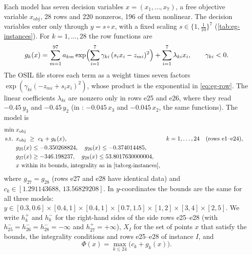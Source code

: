 Each model has seven decision variables $x=(x_1,\dots,x_7)$, a free objective variable $x_{\mathrm{obj}}$, 28 rows and 220 nonzeros, 196 of them nonlinear.
The decision variables enter only through $y=s\circ x$, with a fixed scaling $s\in\{1,\tfrac1{10}\}^7$ (\cref{tab:eg-instances}).
For $k=1,\dots,28$ the row functions are
\begin{equation}\label{eq:eg-row}
  g_k(x)=\sum_{m=1}^{97} a_{km}\exp\Bigl(\sum_{i=1}^{7}\gamma_{ki}\,(s_ix_i-z_{mi})^2\Bigr)+\sum_{i=1}^{7}\lambda_{ki}x_i ,
  \qquad \gamma_{ki}<0 .
\end{equation}
The OSIL file stores each term as a weight times seven factors $\exp(\gamma_{ki}(-z_{mi}+s_ix_i)^2)$, whose product is the exponential in \eqref{eq:eg-row}.
The linear coefficients $\lambda_{ki}$ are nonzero only in rows e25 and e26, where they read $-0.45\,y_3$ and $-0.45\,y_2$ (in : $-0.045\,x_3$ and $-0.045\,x_2$, the same functions).
The model is
\begin{equation}\label{eq:eg-model}
\begin{aligned}
  \min\;& x_{\mathrm{obj}}\\
  \text{s.t. }& x_{\mathrm{obj}}\ \ge\ c_k+g_k(x), && k=1,\dots,24 \quad(\text{rows e1--e24}),\\
  & g_{25}(x)\le -0.350268824,\quad g_{26}(x)\le -0.374014485, && \\
  & g_{27}(x)\ge -346.198237,\quad g_{28}(x)\le 53.8017630000004, && \\
  & x \text{ within its bounds, integrality as in \cref{tab:eg-instances}},
\end{aligned}
\end{equation}
where $g_{27}=g_{28}$ (rows e27 and e28 have identical data) and $c_k\in[1.291143688,\,13.56829208]$.
In $y$-coordinates the bounds are the same for all three models:
$y\in[0.3,0.6]\times[0.4,1]\times[0.4,1]\times[0.7,1.5]\times[1,2]\times[3,4]\times[2,5]$.
We write $h_k^+$ and $h_k^-$ for the right-hand sides of the side rows e25--e28 (with $h^-_{25}=h^-_{26}=h^-_{28}=-\infty$ and $h^+_{27}=+\infty$), $X_I$ for the set of points $x$ that satisfy the bounds, the integrality conditions and rows e25--e28 of instance $I$, and
\begin{equation}\label{eq:eg-phi}
  \Phi(x)=\max_{k\le 24}\bigl(c_k+g_k(x)\bigr).
\end{equation}

